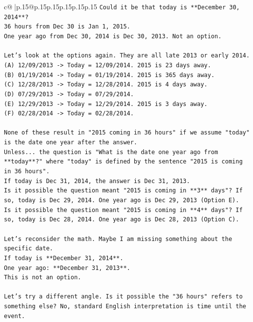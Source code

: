 \documentclass{article}
\begin{document}
{\begin{supertabular}{c@{$\;$}|p{.15\linewidth}@{}p{.15\linewidth}p{.15\linewidth}p{.15\linewidth}p{.15\linewidth}p{.15\linewidth}}
{{{\texttt{Could it be that today is **December 30, 2014**?} \\
\texttt{36 hours from Dec 30 is Jan 1, 2015.} \\
\texttt{One year ago from Dec 30, 2014 is Dec 30, 2013. Not an option.} \\
\\ 
\texttt{Let's look at the options again. They are all late 2013 or early 2014.} \\
\texttt{(A) 12/09/2013 {-}> Today = 12/09/2014. 2015 is 23 days away.} \\
\texttt{(B) 01/19/2014 {-}> Today = 01/19/2014. 2015 is 365 days away.} \\
\texttt{(C) 12/28/2013 {-}> Today = 12/28/2014. 2015 is 4 days away.} \\
\texttt{(D) 07/29/2013 {-}> Today = 07/29/2014.} \\
\texttt{(E) 12/29/2013 {-}> Today = 12/29/2014. 2015 is 3 days away.} \\
\texttt{(F) 02/28/2014 {-}> Today = 02/28/2014.} \\
\\ 
\texttt{None of these result in "2015 coming in 36 hours" if we assume "today" is the date one year after the answer.} \\
\texttt{Unless... the question is "What is the date one year ago from **today**?" where "today" is defined by the sentence "2015 is coming in 36 hours".} \\
\texttt{If today is Dec 31, 2014, the answer is Dec 31, 2013.} \\
\texttt{Is it possible the question meant "2015 is coming in **3** days"? If so, today is Dec 29, 2014. One year ago is Dec 29, 2013 (Option E).} \\
\texttt{Is it possible the question meant "2015 is coming in **4** days"? If so, today is Dec 28, 2014. One year ago is Dec 28, 2013 (Option C).} \\
\\ 
\texttt{Let's reconsider the math. Maybe I am missing something about the specific date.} \\
\texttt{If today is **December 31, 2014**.} \\
\texttt{One year ago: **December 31, 2013**.} \\
\texttt{This is not an option.} \\
\\ 
\texttt{Let's try a different angle. Is it possible the "36 hours" refers to something else? No, standard English interpretation is time until the event.} \\
}}}
\end{supertabular}}
\end{document}
